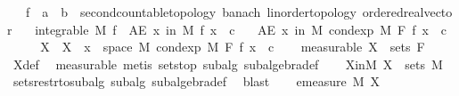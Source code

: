 \begin{isabellebody}
\ \ \ f\ {\isacharcolon}{\kern0pt}{\isacharcolon}{\kern0pt}\ {\isachardoublequoteopen}{\isacharprime}{\kern0pt}a\ {\isasymRightarrow}\ {\isacharprime}{\kern0pt}b\ {\isacharcolon}{\kern0pt}{\isacharcolon}{\kern0pt}\ {\isacharbraceleft}{\kern0pt}second{\isacharunderscore}{\kern0pt}countable{\isacharunderscore}{\kern0pt}topology{\isacharcomma}{\kern0pt}\ banach{\isacharcomma}{\kern0pt}\ linorder{\isacharunderscore}{\kern0pt}topology{\isacharcomma}{\kern0pt}\ ordered{\isacharunderscore}{\kern0pt}real{\isacharunderscore}{\kern0pt}vector{\isacharbraceright}{\kern0pt}{\isachardoublequoteclose}\isanewline
\ \ \ {\isachardoublequoteopen}integrable\ M\ f{\isachardoublequoteclose}\ \ {\isachardoublequoteopen}AE\ x\ in\ M{\isachardot}{\kern0pt}\ f\ x\ {\isachargreater}{\kern0pt}\ c{\isachardoublequoteclose}\isanewline
\ \ \ {\isachardoublequoteopen}AE\ x\ in\ M{\isachardot}{\kern0pt}\ cond{\isacharunderscore}{\kern0pt}exp\ M\ F\ f\ x\ {\isachargreater}{\kern0pt}\ c{\isachardoublequoteclose}\isanewline
%
\isadelimproof
%
\endisadelimproof
%
\isatagproof
{}\isamarkupfalse%
\ {\isacharminus}{\kern0pt}\isanewline
\ \ \isamarkupfalse%
\ X\ \ {\isachardoublequoteopen}X\ {\isacharequal}{\kern0pt}\ {\isacharbraceleft}{\kern0pt}x\ {\isasymin}\ space\ M{\isachardot}{\kern0pt}\ cond{\isacharunderscore}{\kern0pt}exp\ M\ F\ f\ x\ {\isasymle}\ c{\isacharbraceright}{\kern0pt}{\isachardoublequoteclose}\isanewline
\ \ \isamarkupfalse%
\ {\isacharbrackleft}{\kern0pt}measurable{\isacharbrackright}{\kern0pt}{\isacharcolon}{\kern0pt}\ {\isachardoublequoteopen}X\ {\isasymin}\ sets\ F{\isachardoublequoteclose}\ \isamarkupfalse%
\ X{\isacharunderscore}{\kern0pt}def\ \isamarkupfalse%
\ measurable\ {\isacharparenleft}{\kern0pt}metis\ sets{\isachardot}{\kern0pt}top\ subalg\ subalgebra{\isacharunderscore}{\kern0pt}def{\isacharparenright}{\kern0pt}\isanewline
\ \ \isamarkupfalse%
\ X{\isacharunderscore}{\kern0pt}in{\isacharunderscore}{\kern0pt}M{\isacharcolon}{\kern0pt}\ {\isachardoublequoteopen}X\ {\isasymin}\ sets\ M{\isachardoublequoteclose}\ \isamarkupfalse%
\ sets{\isacharunderscore}{\kern0pt}restr{\isacharunderscore}{\kern0pt}to{\isacharunderscore}{\kern0pt}subalg\ subalg\ subalgebra{\isacharunderscore}{\kern0pt}def\ \isamarkupfalse%
\ blast\isanewline
\ \ \isamarkupfalse%
\ {\isachardoublequoteopen}emeasure\ M\ X\ {\isacharequal}{\kern0pt}\ {}{\isachardoublequoteclose}\isanewline

\end{isabellebody}
